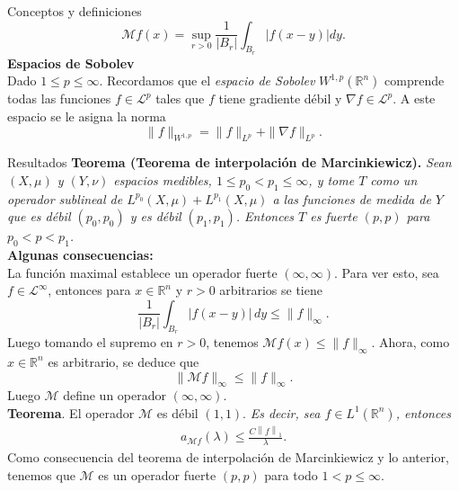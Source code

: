 \documentclass[final]{beamer}
\providecommand{\norm}[1]{\left\|#1\right\|}
\newlength{\colwidth}
\begin{document}
\begin{frame}[t]
\begin{columns}[t]
\begin{column}{\colwidth}
\begin{block}{Conceptos y definiciones}
			$$\mathcal{M}f(x)=\sup_{r>0}\frac{1}{|B_r|}\int_{B_r}|f(x-y)|dy.$$
    \textbf{Espacios de Sobolev}\\
      Dado $1\leq p\leq \infty$. Recordamos que el \emph{espacio de Sobolev} $W^{1,p}(\mathbb{R}^n)$ comprende todas las funciones $f\in \mathcal{L}^p$ tales que $f$ tiene gradiente débil y $\nabla f\in \mathcal{L}^p$. A este espacio se le asigna la norma
          \begin{equation*}
              \|f\|_{W^{1,p}}=\|f\|_{L^p}+\|\nabla f\|_{L^p}.
          \end{equation*}
  \end{block}

  \begin{alertblock}{Resultados}
    \textbf{Teorema (Teorema de interpolación de Marcinkiewicz).} \emph{Sean $(X, \mu)$ y $(Y, \nu)$ espacios medibles, $1 \leq p_0<p_1 \leq \infty$, y tome $T$ como un operador sublineal de $L^{p_0}(X, \mu)+L^{p_1}(X, \mu)$ a las funciones de medida de $Y$ que es débil $\left(p_0, p_0\right)$ y es débil $\left(p_1, p_1\right)$. Entonces $T$ es fuerte $(p, p)$ para $p_0<p<p_1$.}\\
      \vspace{0.2cm}
      {\bf Algunas consecuencias:}\\
      La función maximal establece un operador fuerte $(\infty,\infty)$. Para ver esto, sea $f\in \mathcal{L}^{\infty}$, entonces para $x\in \mathbb{R}^n$ y $r>0$ arbitrarios se tiene
      \begin{equation*}
        \frac{1}{|B_r|}\int_{B_r} |f(x-y)|\, dy \leq \|f\|_{\infty}.
      \end{equation*}
      Luego tomando el supremo en $r>0$, tenemos $\mathcal{M}f(x)\leq \|f\|_{\infty}$. Ahora, como $x\in \mathbb{R}^n$ es arbitrario, se deduce que
      \begin{equation*}
        \|\mathcal{M}f\|_{\infty}\leq \|f\|_{\infty}.   
      \end{equation*}
      Luego $\mathcal{M}$ define un operador $(\infty,\infty)$.\\
      \vspace{0.2cm}
      {\bf Teorema}. {El operador $\mathcal{M}$ es débil $(1,1)$.} \emph{Es decir, sea $f\in L^{1}(\mathbb{R}^{n})$, entonces
      \begin{align*}
        a_{\mathcal{M}f}(\lambda)\leq \frac{C\norm{f}_{1}}{\lambda}.
      \end{align*}}
      \vspace{0.2cm}
      Como consecuencia del teorema de interpolación de Marcinkiewicz y lo anterior, tenemos que $\mathcal{M}$ es un operador fuerte $(p,p)$ para todo $1<p\leq \infty$.\\

\end{alertblock}
\end{column}
\end{columns}
\end{frame}
\end{document}
